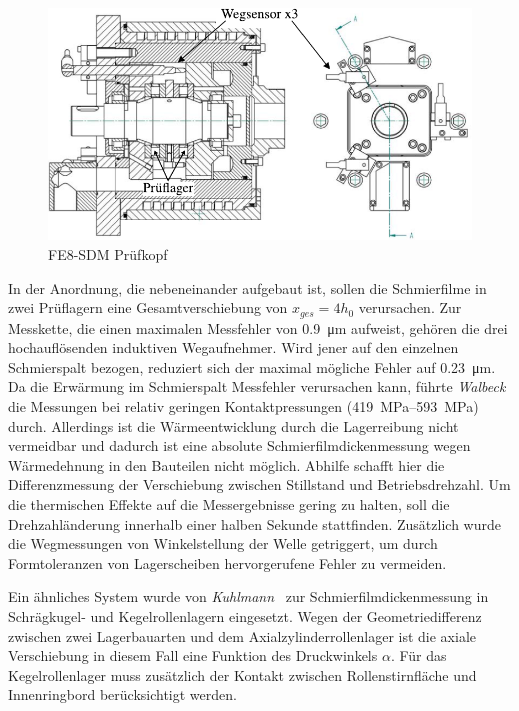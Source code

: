 \begin{figure}[htb]
    \centering
    \includegraphics[]{./images/fe8_sdm_walbeck.pdf}
    \caption{FE8-SDM Prüfkopf~\cite{Walbeck_2004}}
    \label{fig:fe8_sdm_walbeck}
\end{figure}

In der Anordnung, die nebeneinander aufgebaut ist, sollen die Schmierfilme in zwei Prüflagern eine Gesamtverschiebung von $x_{ges} = 4  h_0$ verursachen.
Zur Messkette, die einen maximalen Messfehler von \SI{0,9}{\micro\meter} aufweist, gehören die drei hochauflösenden induktiven Wegaufnehmer.
Wird jener auf den einzelnen Schmierspalt bezogen, reduziert sich der maximal mögliche Fehler auf \SI{0,23}{\micro\meter}.
Da die Erwärmung im Schmierspalt Messfehler verursachen kann, führte \textit{Walbeck} die Messungen bei relativ geringen Kontaktpressungen (\SIrange{419}{593}{\mega\pascal}) durch.
Allerdings ist die Wärmeentwicklung durch die Lagerreibung nicht vermeidbar und dadurch ist eine absolute Schmierfilmdickenmessung wegen Wärmedehnung in den Bauteilen nicht möglich.
Abhilfe schafft hier die Differenzmessung der Verschiebung zwischen Stillstand und Betriebsdrehzahl.
Um die thermischen Effekte auf die Messergebnisse gering zu halten, soll die Drehzahländerung innerhalb einer halben Sekunde stattfinden.
Zusätzlich wurde die Wegmessungen von Winkelstellung der Welle getriggert, um durch Formtoleranzen von Lagerscheiben hervorgerufene Fehler zu vermeiden.

Ein ähnliches System wurde von \textit{Kuhlmann}~\cite{kuhlmann_2009} zur Schmierfilmdickenmessung in Schrägkugel- und Kegelrollenlagern eingesetzt.
Wegen der Geometriedifferenz zwischen zwei Lagerbauarten und dem Axialzylinderrollenlager ist die axiale Verschiebung in diesem Fall eine Funktion des Druckwinkels $\alpha$.
Für das Kegelrollenlager muss zusätzlich der Kontakt zwischen Rollenstirnfläche und Innenringbord berücksichtigt werden.

